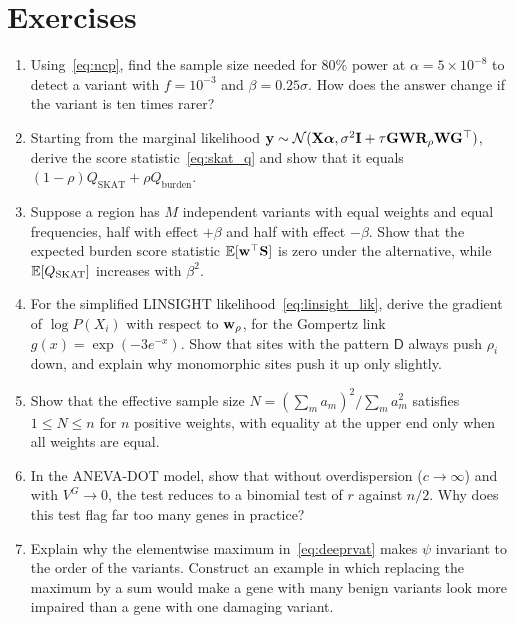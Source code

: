 \section*{Exercises}

\begin{enumerate}
  \item Using~\eqref{eq:ncp}, find the sample size needed for 80\% power at $\alpha=5\times10^{-8}$ to detect a variant with $f=10^{-3}$ and $\beta=0.25\sigma$. How does the answer change if the variant is ten times rarer?
  \item Starting from the marginal likelihood $\mathbf{y}\sim\mathcal{N}(\mathbf{X}\boldsymbol{\alpha},\sigma^2\mathbf{I}+\tau\mathbf{G}\mathbf{W}\mathbf{R}_\rho\mathbf{W}\mathbf{G}^\top)$, derive the score statistic~\eqref{eq:skat_q} and show that it equals $(1-\rho)Q_{\text{SKAT}}+\rho Q_{\text{burden}}$.
  \item Suppose a region has $M$ independent variants with equal weights and equal frequencies, half with effect $+\beta$ and half with effect $-\beta$. Show that the expected burden score statistic $\mathbb{E}[\mathbf{w}^\top\mathbf{S}]$ is zero under the alternative, while $\mathbb{E}[Q_{\text{SKAT}}]$ increases with $\beta^2$.
  \item For the simplified LINSIGHT likelihood~\eqref{eq:linsight_lik}, derive the gradient of $\log P(X_i)$ with respect to $\mathbf{w}_\rho$, for the Gompertz link $g(x)=\exp(-3e^{-x})$. Show that sites with the pattern $\mathsf{D}$ always push $\rho_i$ down, and explain why monomorphic sites push it up only slightly.
  \item Show that the effective sample size $N=(\sum_ma_m)^2/\sum_ma_m^2$ satisfies $1\leq N\leq n$ for $n$ positive weights, with equality at the upper end only when all weights are equal.
  \item In the ANEVA-DOT model, show that without overdispersion ($c\to\infty$) and with $V^G\to 0$, the test reduces to a binomial test of $r$ against $n/2$. Why does this test flag far too many genes in practice?
  \item Explain why the elementwise maximum in~\eqref{eq:deeprvat} makes $\psi$ invariant to the order of the variants. Construct an example in which replacing the maximum by a sum would make a gene with many benign variants look more impaired than a gene with one damaging variant.
\end{enumerate}
